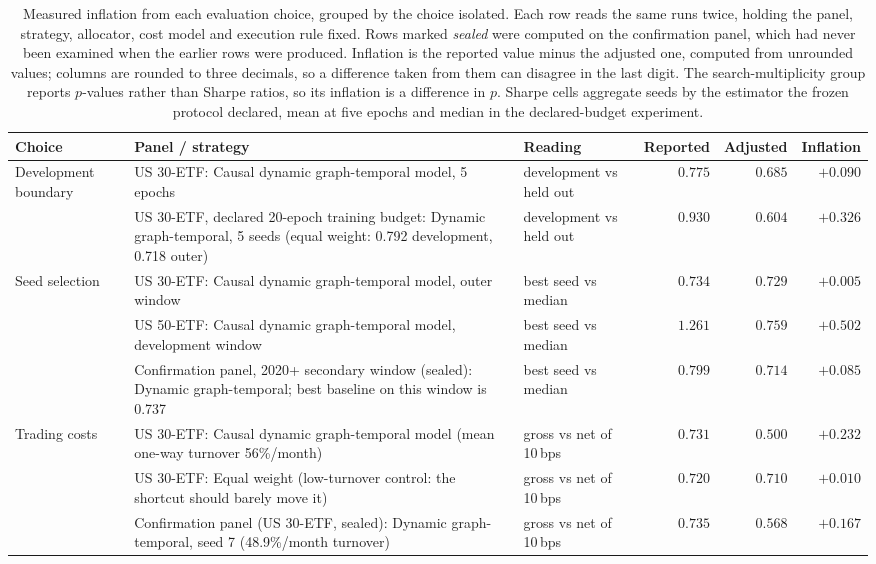 \begin{table}[t]
\centering
\caption{Measured inflation from each evaluation choice, grouped by the choice
isolated. Each row reads the same runs twice, holding the panel, strategy, allocator,
cost model and execution rule fixed. Rows marked \emph{sealed} were computed on the
confirmation panel, which had never been examined when the earlier rows were produced.
Inflation is the reported value minus the adjusted one, computed from unrounded values;
columns are rounded to three decimals, so a difference taken from them can disagree in the
last digit. The search-multiplicity group reports $p$-values rather than Sharpe
ratios, so its inflation is a difference in $p$. Sharpe cells aggregate seeds by the
estimator the frozen protocol declared, mean at five epochs and median in the
declared-budget experiment.}
\label{tab:inflation}
\small
\begin{tabular}{p{2.6cm}p{5.0cm}p{4.2cm}rrr}
\toprule
Choice & Panel / strategy & Reading & Reported & Adjusted & Inflation \\
\midrule
Development boundary & US 30-ETF: Causal dynamic graph-temporal model, 5 epochs & development vs held out & $0.775$ & $0.685$ & $\mathbf{+0.090}$ \\
 & US 30-ETF, declared 20-epoch training budget: Dynamic graph-temporal, 5 seeds (equal weight: 0.792 development, 0.718 outer) & development vs held out & $0.930$ & $0.604$ & $\mathbf{+0.326}$ \\
\addlinespace[2pt]
Seed selection & US 30-ETF: Causal dynamic graph-temporal model, outer window & best seed vs median & $0.734$ & $0.729$ & $\mathbf{+0.005}$ \\
 & US 50-ETF: Causal dynamic graph-temporal model, development window & best seed vs median & $1.261$ & $0.759$ & $\mathbf{+0.502}$ \\
 & Confirmation panel, 2020+ secondary window (sealed): Dynamic graph-temporal; best baseline on this window is 0.737 & best seed vs median & $0.799$ & $0.714$ & $\mathbf{+0.085}$ \\
\addlinespace[2pt]
Trading costs & US 30-ETF: Causal dynamic graph-temporal model (mean one-way turnover 56\%/month) & gross vs net of 10\,bps & $0.731$ & $0.500$ & $\mathbf{+0.232}$ \\
 & US 30-ETF: Equal weight (low-turnover control: the shortcut should barely move it) & gross vs net of 10\,bps & $0.720$ & $0.710$ & $\mathbf{+0.010}$ \\
 & Confirmation panel (US 30-ETF, sealed): Dynamic graph-temporal, seed 7 (48.9\%/month turnover) & gross vs net of 10\,bps & $0.735$ & $0.568$ & $\mathbf{+0.167}$ \\

\end{tabular}
\end{table}
